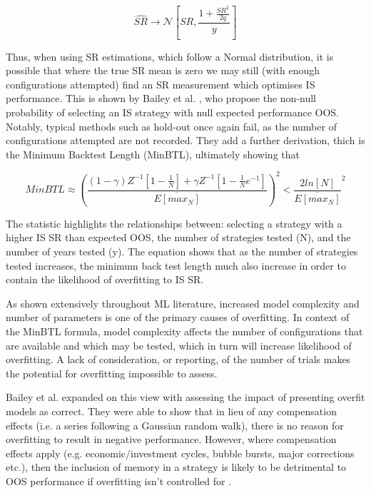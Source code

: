 \documentclass[a4paper,11pt,oneside]{article}
\theoremstyle{plain}
\theoremstyle{definition}
\begin{document}
\begin{equation}\label{SRConvergence}
  \hat{SR}  \rightarrow \mathcal {N} [SR,\frac{1 + \frac{SR^2}{2q}}{y}]
\end{equation}

Thus, when using SR estimations, which follow a Normal distribution, it is possible that where the true SR mean is 
zero we may still (with enough configurations attempted) find an SR measurement which optimises IS performance. 
This is shown by Bailey et al. \cite{BaileyBTL}, who propose the non-null probability of selecting an IS strategy with null expected 
performance OOS. Notably, typical methods such as hold-out once again fail, as the number of configurations 
attempted are not recorded. They add a further derivation, thich is the Minimum Backtest Length (MinBTL), ultimately 
showing that

\begin{equation}\label{MinBTL}
MinBTL \approx (\frac{
                                  (1-\gamma)Z^{-1}[1-\frac{1}{N}] + \gamma Z^{-1}[1 -\frac{1}{N}e^{-1}]}
                                  {\overline{E[max_N]}})^2
                                  < \frac{2ln[N]}{\overline{E[max_N]}}^2
\end{equation}

The statistic highlights the relationships between: selecting a strategy with a higher IS SR than expected OOS, 
the number of strategies tested (N), and the number of years tested (y). The equation shows that  as the number 
of strategies tested increases, the minimum back test length much also increase in order to contain the likelihood 
of overfitting to IS SR. 
\hfill \break 

As shown extensively throughout ML literature, increased model complexity and number of parameters is one of 
the primary causes of overfitting. In context of the MinBTL formula, model complexity affects the number of 
configurations that are available and which may be tested, which in turn will increase likelihood of overfitting. 
A lack of consideration, or reporting, of the number of trials makes the potential for overfitting impossible to assess. 
\hfill \break 

Bailey et al. expanded on this view with assessing the impact of presenting overfit models as correct. 
They were able to show that in lieu of any compensation effects (i.e. a series following a Gaussian random walk), 
there is no reason for overfitting to result in negative performance. However, where compensation effects apply 
(e.g. economic/investment cycles, bubble bursts, major corrections etc.), then the inclusion of memory in a strategy
 is likely to be detrimental to OOS performance if overfitting isn’t controlled for \cite{BaileyBTL}.
\hfill \break 
\end{document}

